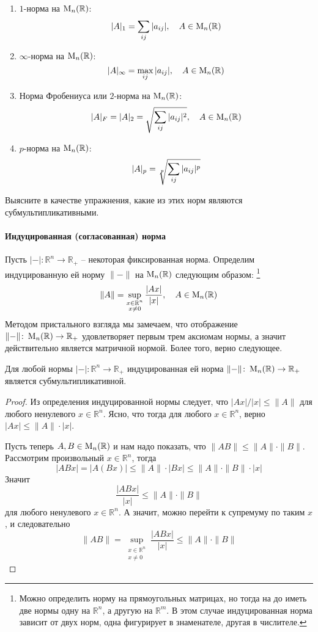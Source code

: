 \begin{enumerate}
\item $1$-норма на $\operatorname{M}_{n}(\mathbb R)$:
\[
|A|_1 = \sum_{ij}|a_{ij}|,\quad A\in\operatorname{M}_{n}(\mathbb R)
\]

\item $\infty$-норма на $\operatorname{M}_{n}(\mathbb R)$:
\[
|A|_\infty = \max_{ij}|a_{ij}|,\quad A\in\operatorname{M}_{n}(\mathbb R)
\]

\item Норма Фробениуса или $2$-норма на $\operatorname{M}_{n}(\mathbb R)$:
\[
|A|_F = |A|_2 = \sqrt{\sum_{ij}|a_{ij}|^2},\quad A\in\operatorname{M}_{n}(\mathbb R)
\]

\item $p$-норма на $\operatorname{M}_{n}(\mathbb R)$:
\[
|A|_p = \sqrt[p\vphantom{\int}]{\sum_{ij}|a_{ij}|^p}
\]
\end{enumerate}

Выясните в качестве упражнения, какие из этих норм являются субмультипликативными.

\paragraph{Индуцированная (согласованная) норма}

Пусть $|{-}|\colon \mathbb R^n \to \mathbb R_+$ -- некоторая фиксированная норма.
Определим индуцированную ей норму $\|{-}\|$ на $\operatorname{M}_{n}(\mathbb R)$ следующим образом:%
\footnote{Можно определить норму на прямоугольных матрицах, но тогда на до иметь две нормы одну на $\mathbb R^n$, а другую на $\mathbb R^m$.
В этом случае индуцированная норма зависит от двух норм, одна фигурирует в знаменателе, другая в числителе.}
\[
\|A\| = \sup_{\substack{x\in\mathbb R^n\\x\neq 0}}\frac{|Ax|}{|x|},\quad A\in\operatorname{M}_{n}(\mathbb R)
\]
Методом пристального взгляда мы замечаем, что отображение $\|{-}\|\colon \operatorname{M}_{n}(\mathbb R)\to \mathbb R_+$ удовлетворяет первым трем аксиомам нормы, а значит действительно является матричной нормой.
Более того, верно следующее.

\begin{claim*}
Для любой нормы $|{-}|\colon \mathbb R^n\to \mathbb R_+$ индуцированная ей норма $\|{-}\|\colon \operatorname{M}_{n}(\mathbb R)\to \mathbb R_+$ является субмультипликативной.
\end{claim*}
\begin{proof}
Из определения индуцированной нормы следует, что $|Ax|/|x|\leqslant \|A\|$ для любого ненулевого $x\in\mathbb R^n$.
Ясно, что тогда для любого $x\in\mathbb R^n$, верно $|Ax|\leqslant \|A\|\cdot|x|$.

Пусть теперь $A, B\in\operatorname{M}_{n}(\mathbb R)$ и нам надо показать, что $\|AB\|\leqslant \|A\|\cdot \|B\|$.
Рассмотрим произвольный $x\in\mathbb R^n$, тогда
\[
|ABx| = |A (Bx)|\leqslant \|A\|\cdot |Bx|\leqslant \|A\| \cdot \|B\|\cdot |x|
\]
Значит
\[
\frac{|ABx|}{|x|}\leqslant \|A\|\cdot\|B\|
\]
для любого ненулевого $x\in\mathbb R^n$.
А значит, можно перейти к супремуму по таким $x$, и следовательно
\[
\|AB\| = \sup_{\substack{x\in\mathbb R^n\\x\neq 0}}\frac{|ABx|}{|x|}\leqslant \|A\|\cdot \|B\|
\]
\end{proof}

